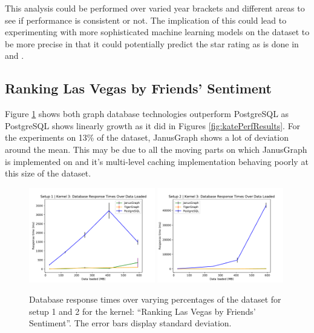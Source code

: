 This analysis could be performed over varied year brackets and different areas to see if performance is consistent or not. The implication of this could lead to experimenting with more sophisticated machine learning models on the dataset to be more precise in that it could potentially predict the star rating as is done in \cite{reddy2017prediction} and \cite{monett2016predicting}.

\subsection{Ranking Las Vegas by Friends' Sentiment}

Figure \ref{fig:cityPerfResults} shows both graph database technologies outperform PostgreSQL as PostgreSQL shows linearly growth as it did in Figures \ref{fig:katePerfResults}. For the experiments on 13\% of the dataset, JanusGraph shows a lot of deviation around the mean. This may be due to all the moving parts on which JanusGraph is implemented on and it's multi-level caching implementation behaving poorly at this size of the dataset.

\begin{figure}[h]
    \centering
    \includegraphics[width=0.49\textwidth]{img/perfResults/cityPlotSetup1.pdf}
    \includegraphics[width=0.49\textwidth]{img/perfResults/cityPlotSetup2.pdf}
    \caption{Database response times over varying percentages of the dataset for setup 1 and 2 for the kernel: ``Ranking Las Vegas by Friends' Sentiment''. The error bars display standard deviation.}
    \label{fig:cityPerfResults}
\end{figure}

